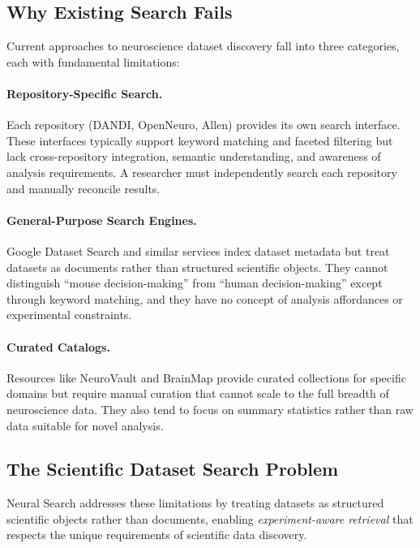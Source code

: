\documentclass{article}
\theoremstyle{definition}
\begin{document}
\subsection{Why Existing Search Fails}

Current approaches to neuroscience dataset discovery fall into three categories, each with fundamental limitations:

\paragraph{Repository-Specific Search.} Each repository (DANDI, OpenNeuro, Allen) provides its own search interface. These interfaces typically support keyword matching and faceted filtering but lack cross-repository integration, semantic understanding, and awareness of analysis requirements. A researcher must independently search each repository and manually reconcile results.

\paragraph{General-Purpose Search Engines.} Google Dataset Search \citep{brickley2019google} and similar services index dataset metadata but treat datasets as documents rather than structured scientific objects. They cannot distinguish ``mouse decision-making'' from ``human decision-making'' except through keyword matching, and they have no concept of analysis affordances or experimental constraints.

\paragraph{Curated Catalogs.} Resources like NeuroVault \citep{gorgolewski2015neurovault} and BrainMap \citep{laird2005brainmap} provide curated collections for specific domains but require manual curation that cannot scale to the full breadth of neuroscience data. They also tend to focus on summary statistics rather than raw data suitable for novel analysis.

\subsection{The Scientific Dataset Search Problem}

Neural Search addresses these limitations by treating datasets as structured scientific objects rather than documents, enabling \textit{experiment-aware retrieval} that respects the unique requirements of scientific data discovery.
\end{document}
